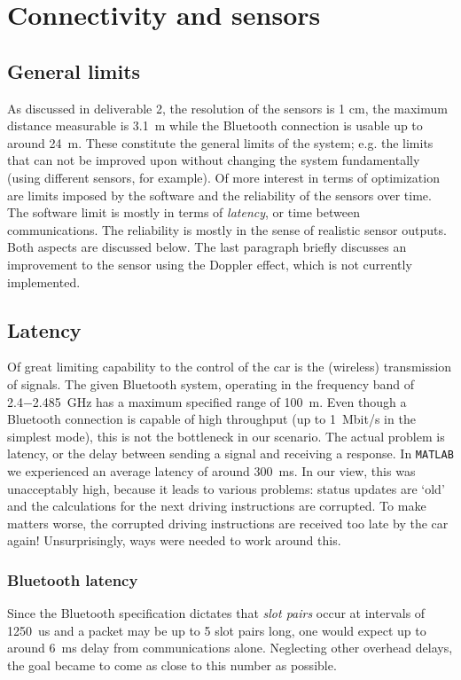 \documentclass[11pt,titlepage]{report}
\begin{document}
\chapter{Connectivity and sensors}
\label{ch:anticollision}
\section{General limits}
As discussed in deliverable 2, the resolution of the sensors is 1 cm, the maximum distance measurable is \SI{3.1}{m} while the Bluetooth connection is usable up to around \SI{24}{m}. These constitute the general limits of the system; e.g. the limits that can not be improved upon without changing the system fundamentally (using different sensors, for example). Of more interest in terms of optimization are limits imposed by the software and the reliability of the sensors over time. The software limit is mostly in terms of \textit{latency}, or time between communications. The reliability is mostly in the sense of realistic sensor outputs. Both aspects are discussed below. The last paragraph briefly discusses an improvement to the sensor using the Doppler effect, which is not currently implemented.

\section{Latency}
Of great limiting capability to the control of the car is the (wireless) transmission of signals. The given Bluetooth system, operating in the frequency band of \SI{2.4-2.485}{GHz} has a maximum specified range of \SI{100}{m}.  Even though a Bluetooth connection is capable of high throughput (up to \SI{1}{Mbit/s} in the simplest mode), this is not the bottleneck in our scenario. The actual problem is latency, or the delay between sending a signal and receiving a response. In \texttt{MATLAB} we experienced an average latency of around \SI{300}{ms}. In our view, this was unacceptably high, because it leads to various problems: status updates are `old' and the calculations for the next driving instructions are corrupted. To make matters worse, the corrupted driving instructions are received too late by the car again! Unsurprisingly, ways were needed to work around this.
\subsection{Bluetooth latency}
Since the Bluetooth specification dictates that \textit{slot pairs} occur at intervals of \SI{1250}{us} and a packet may be up to 5 slot pairs long, one would expect up to around \SI{6}{ms} delay from communications alone. Neglecting other overhead delays, the goal became to come as close to this number as possible. 
\end{document}
